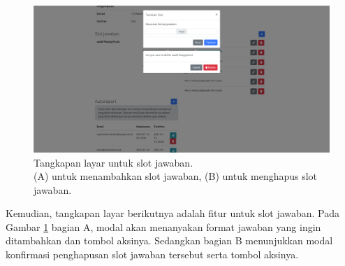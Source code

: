     \begin{figure}
        \centering
        \includegraphics[width=0.7\paperwidth]{Gambar/implemented-interface/admin/ujian-slot-tambah.png}
        \caption{Tangkapan layar untuk slot jawaban. \\ (A) untuk menambahkan slot jawaban, (B) untuk menghapus slot jawaban.}
        \label{fig:screenshot-admin-slot-jawab}
    \end{figure}
    Kemudian, tangkapan layar berikutnya adalah fitur untuk slot jawaban. Pada Gambar \ref{fig:screenshot-admin-slot-jawab}
    bagian A, modal akan menanyakan format jawaban yang ingin ditambahkan dan tombol aksinya. Sedangkan bagian
    B menunjukkan modal konfirmasi penghapusan slot jawaban tersebut serta tombol aksinya.
    
